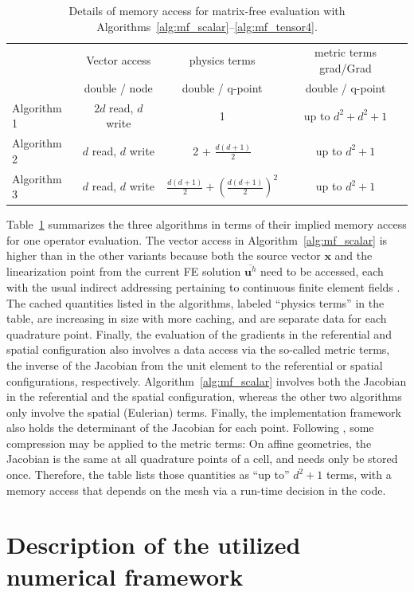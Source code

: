 \documentclass[AMA,STIX1COL]{WileyNJD-v2}
\newcommand*{\gz}[1]{\boldsymbol{#1}}
\begin{document}
\begin{table}
\centering
\caption{Details of memory access for matrix-free evaluation with Algorithms~\ref{alg:mf_scalar}--\ref{alg:mf_tensor4}.}
\label{tab:memory}
\begin{tabular}{|l|ccc|}
\hline
 & Vector access & physics terms & metric terms grad/Grad \\
 & double / node & double / q-point & double / q-point \\
 \hline
Algorithm 1 & $2d$ read, $d$ write & 1 & up to $d^2 + d^2 + 1$\\
Algorithm 2 & $d$ read, $d$ write & 2 + $\frac{d(d+1)}{2}$ & up to $d^2+1$\\
Algorithm 3 & $d$ read, $d$ write & $\frac{d(d+1)}{2}+\left(\frac{d(d+1)}{2}\right)^2$ & up to $d^2+1$\\
\hline
\end{tabular}
\end{table}

{\color{red}
Table~\ref{tab:memory} summarizes the three algorithms in terms of their implied
memory access for one operator evaluation. The vector access in
Algorithm~\ref{alg:mf_scalar} is higher than in the other variants because both
the source vector $\gz x$ and the linearization point from the current FE
solution $\overline{\gz u^h}$ need to be accessed, each with the usual indirect
addressing pertaining to continuous finite element fields \cite{kronbichler12}.
The cached quantities listed in the algorithms, labeled ``physics terms'' in the
table, are increasing in size with more caching, and are separate data for each
quadrature point. Finally, the evaluation of the gradients in the referential
and spatial configuration also involves a data access via the so-called metric
terms, the inverse of the Jacobian from the unit element to the referential or
spatial configurations, respectively. Algorithm~\ref{alg:mf_scalar} involves
both the Jacobian in the referential and the spatial configuration, whereas the other
two algorithms only involve the spatial (Eulerian) terms. Finally, the
implementation framework also holds the determinant of the Jacobian for each
point. Following \cite{kronbichler12}, some compression may be applied to the
metric terms: On affine geometries, the Jacobian is the same at all quadrature
points of a cell, and needs only be stored once. Therefore, the table lists
those quantities as ``up to'' $d^2+1$ terms, with a memory access that depends
on the mesh via a run-time decision in the code.
}

\section{Description of the utilized numerical framework}
\label{sec:framework}
\end{document}
